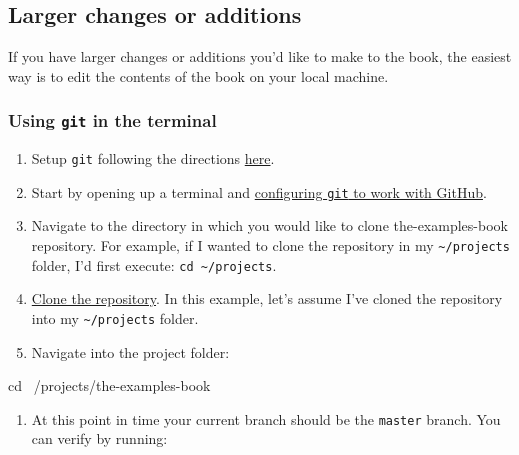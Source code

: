 \documentclass[]{book}
\newenvironment{Shaded}{\begin{snugshade}}{\end{snugshade}}
\newcommand{\BuiltInTok}[1]{#1}
\newcommand{\NormalTok}[1]{#1}
\providecommand{\tightlist}{%
  \setlength{\itemsep}{0pt}\setlength{\parskip}{0pt}}
\begin{document}
\subsection{Larger changes or
additions}\label{larger-changes-or-additions}

If you have larger changes or additions you'd like to make to the book,
the easiest way is to edit the contents of the book on your local
machine.

\subsubsection{\texorpdfstring{Using \texttt{git} in the
terminal}{Using git in the terminal}}\label{using-git-in-the-terminal}

\begin{enumerate}
\def\labelenumi{\arabic{enumi}.}
\tightlist
\item
  Setup \texttt{git} following the directions
  \protect\hyperlink{git-install}{here}.
\item
  Start by opening up a terminal and
  \protect\hyperlink{configure-git}{configuring \texttt{git} to work
  with GitHub}.
\item
  Navigate to the directory in which you would like to clone
  the-examples-book repository. For example, if I wanted to clone the
  repository in my \texttt{\textasciitilde{}/projects} folder, I'd first
  execute: \texttt{cd\ \textasciitilde{}/projects}.
\item
  \protect\hyperlink{git-clone-repository}{Clone the repository}. In
  this example, let's assume I've cloned the repository into my
  \texttt{\textasciitilde{}/projects} folder.
\item
  Navigate into the project folder:
\end{enumerate}

\begin{Shaded}
\begin{Highlighting}[]
\BuiltInTok{cd}\NormalTok{ ~/projects/the-examples-book}
\end{Highlighting}
\end{Shaded}

\begin{enumerate}
\def\labelenumi{\arabic{enumi}.}
\setcounter{enumi}{5}
\tightlist
\item
  At this point in time your current branch should be the
  \texttt{master} branch. You can verify by running:
\end{enumerate}
\end{document}
